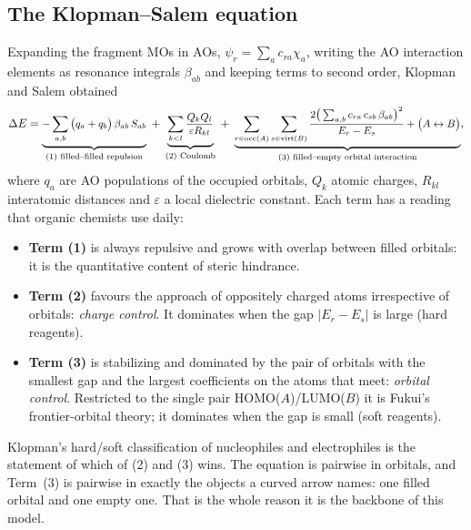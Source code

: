 \documentclass[11pt,a4paper]{article}
\newcommand{\occ}{\mathrm{occ}}
\newcommand{\virt}{\mathrm{virt}}
\begin{document}
\subsection{The Klopman--Salem equation}
\label{sec:ks-theory}
Expanding the fragment MOs in AOs, $\psi_r=\sum_a c_{ra}\chi_a$, writing the AO interaction elements as resonance integrals $\beta_{ab}$ and keeping terms to second order, Klopman \cite{klopman} and Salem \cite{salem} obtained
\begin{equation}
\small
\Delta E
=\underbrace{-\sum_{a,b}\big(q_a+q_b\big)\,\beta_{ab}\,S_{ab}}_{\text{(1) filled--filled repulsion}}
\;+\;\underbrace{\sum_{k<l}\frac{Q_kQ_l}{\varepsilon R_{kl}}}_{\text{(2) Coulomb}}
\;+\;\underbrace{\sum_{r\in\occ(A)}\sum_{s\in\virt(B)}\frac{2\big(\sum_{a,b}c_{ra}\,c_{sb}\,\beta_{ab}\big)^2}{E_r-E_s}
+\big(A\leftrightarrow B\big)}_{\text{(3) filled--empty orbital interaction}} ,
\label{eq:ks-theory}
\end{equation}
where $q_a$ are AO populations of the occupied orbitals, $Q_k$ atomic charges, $R_{kl}$ interatomic distances and $\varepsilon$ a local dielectric constant. Each term has a reading that organic chemists use daily:
\begin{itemize}[nosep]
\item \textbf{Term (1)} is always repulsive and grows with overlap between filled orbitals: it is the quantitative content of steric hindrance.
\item \textbf{Term (2)} favours the approach of oppositely charged atoms irrespective of orbitals: \emph{charge control}. It dominates when the gap $|E_r-E_s|$ is large (hard reagents).
\item \textbf{Term (3)} is stabilizing and dominated by the pair of orbitals with the smallest gap and the largest coefficients on the atoms that meet: \emph{orbital control}. Restricted to the single pair HOMO($A$)/LUMO($B$) it is Fukui's frontier-orbital theory; it dominates when the gap is small (soft reagents).
\end{itemize}
Klopman's hard/soft classification of nucleophiles and electrophiles is the statement of which of (2) and (3) wins. The equation is pairwise in orbitals, and Term~(3) is pairwise in exactly the objects a curved arrow names: one filled orbital and one empty one. That is the whole reason it is the backbone of this model.
\end{document}
